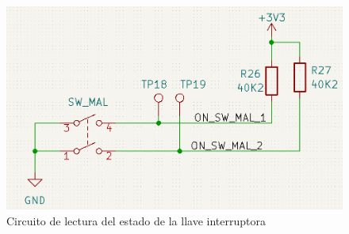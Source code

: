 \begin{figure}[H]
    \centering
    \includegraphics[width = 0.8 \linewidth]{img/llave_mal_sch.png}
    \caption{Circuito de lectura del estado de la llave interruptora}
    \label{fig:llave_mal_sch}
\end{figure}